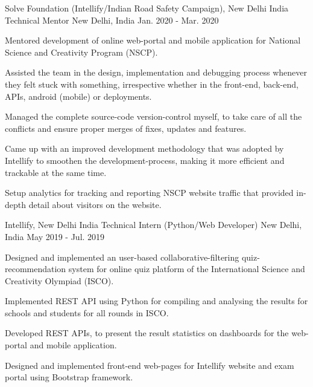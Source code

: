 \begin{cventries}
  \cventry
    {Solve Foundation (Intellify/Indian Road Safety Campaign), New Delhi India} %
    {Technical Mentor} %
    {New Delhi, India} %
    {Jan. 2020 - Mar. 2020} %
    {
      \begin{cvitems} %
        \item {Mentored development of online web-portal and mobile application for National Science and Creativity Program (NSCP).}
        \item {Assisted the team in the design, implementation and debugging process whenever they felt stuck with something, irrespective whether in the front-end, back-end, APIs, android (mobile) or deployments.}
        \item {Managed the complete source-code version-control myself, to take care of all the conflicts and ensure proper merges of fixes, updates and features.}
        \item {Came up with an improved development methodology that was adopted by Intellify to smoothen the development-process, making it more efficient and trackable at the same time.}
        \item {Setup analytics for tracking and reporting NSCP website traffic that provided in-depth detail about visitors on the website.}
      \end{cvitems}
    }

  \cventry
    {Intellify, New Delhi India} %
    {Technical Intern (Python/Web Developer)} %
    {New Delhi, India} %
    {May 2019 - Jul. 2019} %
    {
      \begin{cvitems} %
        \item {Designed and implemented an user-based collaborative-filtering quiz-recommendation system for online quiz platform of the International Science and Creativity Olympiad (ISCO).}
        \item {Implemented REST API using Python for compiling and analysing the results for schools and students for all rounds in ISCO.}
        \item {Developed REST APIs, to present the result statistics on dashboards for the web-portal and mobile application.}
        \item {Designed and implemented front-end web-pages for Intellify website and exam portal using Bootstrap framework.}
      \end{cvitems}
    }


\end{cventries}
